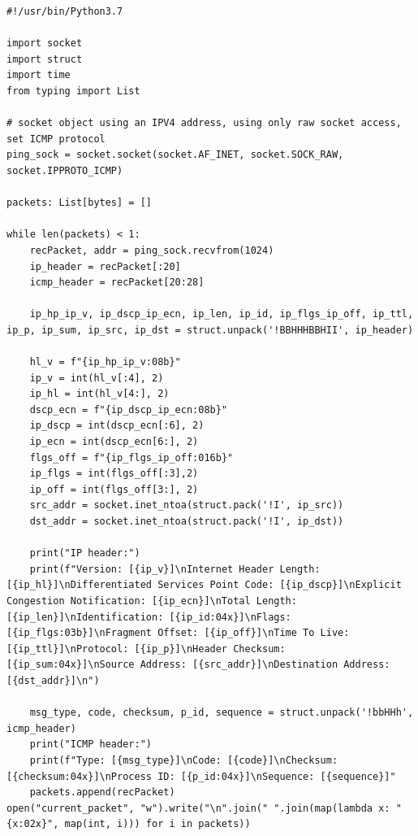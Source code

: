 \documentclass[titlepage]{article}
\begin{document}
\begin{lstlisting}[label=echorecv,caption=\textit{A prototype for receiving \gls{icmp} echo request packets.}]
#!/usr/bin/Python3.7

import socket
import struct
import time
from typing import List

# socket object using an IPV4 address, using only raw socket access, set ICMP protocol        
ping_sock = socket.socket(socket.AF_INET, socket.SOCK_RAW, socket.IPPROTO_ICMP)

packets: List[bytes] = []

while len(packets) < 1:
    recPacket, addr = ping_sock.recvfrom(1024)
    ip_header = recPacket[:20]
    icmp_header = recPacket[20:28]

    ip_hp_ip_v, ip_dscp_ip_ecn, ip_len, ip_id, ip_flgs_ip_off, ip_ttl, ip_p, ip_sum, ip_src, ip_dst = struct.unpack('!BBHHHBBHII', ip_header)

    hl_v = f"{ip_hp_ip_v:08b}"
    ip_v = int(hl_v[:4], 2)
    ip_hl = int(hl_v[4:], 2)
    dscp_ecn = f"{ip_dscp_ip_ecn:08b}"
    ip_dscp = int(dscp_ecn[:6], 2)
    ip_ecn = int(dscp_ecn[6:], 2)
    flgs_off = f"{ip_flgs_ip_off:016b}"
    ip_flgs = int(flgs_off[:3],2)
    ip_off = int(flgs_off[3:], 2)
    src_addr = socket.inet_ntoa(struct.pack('!I', ip_src))
    dst_addr = socket.inet_ntoa(struct.pack('!I', ip_dst))

    print("IP header:")
    print(f"Version: [{ip_v}]\nInternet Header Length: [{ip_hl}]\nDifferentiated Services Point Code: [{ip_dscp}]\nExplicit Congestion Notification: [{ip_ecn}]\nTotal Length: [{ip_len}]\nIdentification: [{ip_id:04x}]\nFlags: [{ip_flgs:03b}]\nFragment Offset: [{ip_off}]\nTime To Live: [{ip_ttl}]\nProtocol: [{ip_p}]\nHeader Checksum: [{ip_sum:04x}]\nSource Address: [{src_addr}]\nDestination Address: [{dst_addr}]\n")

    msg_type, code, checksum, p_id, sequence = struct.unpack('!bbHHh', icmp_header)
    print("ICMP header:")
    print(f"Type: [{msg_type}]\nCode: [{code}]\nChecksum: [{checksum:04x}]\nProcess ID: [{p_id:04x}]\nSequence: [{sequence}]"
    packets.append(recPacket)
open("current_packet", "w").write("\n".join(" ".join(map(lambda x: "{x:02x}", map(int, i))) for i in packets))
\end{lstlisting}
\end{document}
